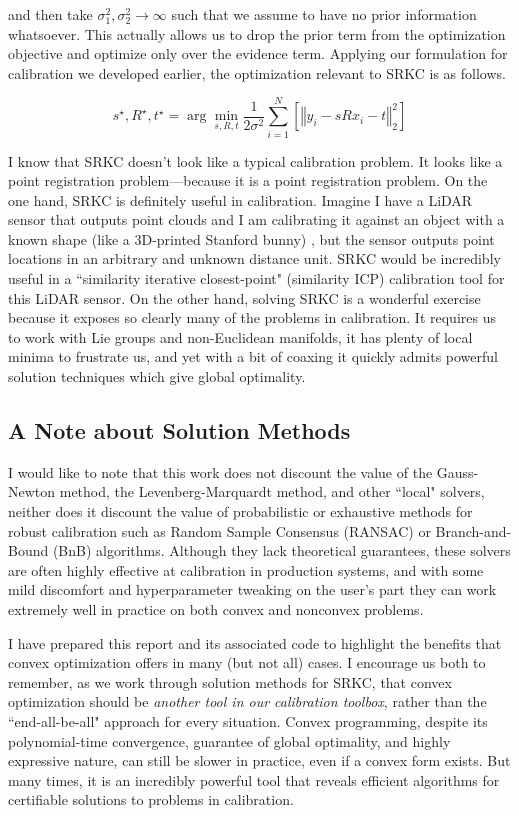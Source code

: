 \documentclass[conference]{IEEEtran}
\begin{document}
and then take \( \sigma_1^2, \sigma_2^2 \rightarrow \infty \) such that we assume to have no prior information whatsoever.  This actually allows us to drop the prior term from the optimization objective and optimize only over the evidence term.  Applying our formulation for calibration we developed earlier, the optimization relevant to SRKC is as follows.

\begin{equation}
	s^\star, R^\star, t^\star = \arg\min_{s, R, t} \frac{1}{2\sigma^2} \sum_{i=1}^N \left[\left\Vert y_i - s R x_i - t \right\Vert_2^2 \right]
	\label{eq:srkc}
\end{equation}

I know that SRKC doesn't look like a typical calibration problem.  It looks like a point registration problem---because it is a point registration problem.  On the one hand, SRKC is definitely useful in calibration.  Imagine I have a LiDAR sensor that outputs point clouds and I am calibrating it against an object with a known shape (like a 3D-printed Stanford bunny) \cite{stanford}, but the sensor outputs point locations in an arbitrary and unknown distance unit.  SRKC would be incredibly useful in a ``similarity iterative closest-point" (similarity ICP) calibration tool for this LiDAR sensor.  On the other hand, solving SRKC is a wonderful exercise because it exposes so clearly many of the problems in calibration.  It requires us to work with Lie groups and non-Euclidean manifolds, it has plenty of local minima to frustrate us, and yet with a bit of coaxing it quickly admits powerful solution techniques which give global optimality.

\subsection{A Note about Solution Methods}

I would like to note that this work does not discount the value of the Gauss-Newton method, the Levenberg-Marquardt method, and other ``local" solvers, neither does it discount the value of probabilistic or exhaustive methods for robust calibration such as Random Sample Consensus (RANSAC) or Branch-and-Bound (BnB) algorithms.  Although they lack theoretical guarantees, these solvers are often highly effective at calibration in production systems, and with some mild discomfort and hyperparameter tweaking on the user's part they can work extremely well in practice on both convex and nonconvex problems.

I have prepared this report and its associated code to highlight the benefits that convex optimization offers in many (but not all) cases.  I encourage us both to remember, as we work through solution methods for SRKC, that convex optimization should be \textit{another tool in our calibration toolbox}, rather than the ``end-all-be-all" approach for every situation.  Convex programming, despite its polynomial-time convergence, guarantee of global optimality, and highly expressive nature, can still be slower in practice, even if a convex form exists.  But many times, it is an incredibly powerful tool that reveals efficient algorithms for certifiable solutions to problems in calibration.
\end{document}
